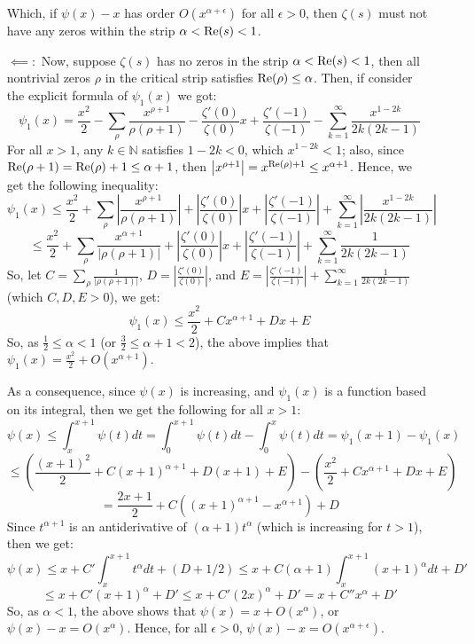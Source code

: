 \documentclass{article}
\begin{document}
\begin{itemize}
    Which, if $\psi(x)-x$ has order $O(x^{\alpha+\epsilon})$ for all $\epsilon>0$, then $\zeta(s)$ must not have any zeros within the strip $\alpha<\textmd{Re}(s)<1$.
    
    \hfil

    \item[$\impliedby:$] Now, suppose $\zeta(s)$ has no zeros in the strip $\alpha<\textmd{Re}(s)<1$, then all nontrivial zeros $\rho$ in the critical strip satisfies $\textmd{Re}(\rho)\leq \alpha$. Then, if consider the explicit formula of $\psi_1(x)$ we got:
    $$\psi_1(x)=\frac{x^2}{2}-\sum_{\rho}\frac{x^{\rho+1}}{\rho(\rho+1)}-\frac{\zeta'(0)}{\zeta(0)}x+\frac{\zeta'(-1)}{\zeta(-1)}-\sum_{k=1}^{\infty}\frac{x^{1-2k}}{2k(2k-1)}$$
    For all $x>1$, any $k\in\mathbb{N}$ satisfies $1-2k<0$, which $x^{1-2k}<1$; also, since $\textmd{Re}(\rho+1)=\textmd{Re}(\rho)+1 \leq \alpha+1$, then $\left|x^{\rho+1}\right| = x^{\textmd{Re}(\rho)+1} \leq x^{\alpha+1}$. Hence, we get the following inequality:
    $$\psi_1(x) \leq \frac{x^2}{2}+\sum_{\rho}\left|\frac{x^{\rho+1}}{\rho(\rho+1)}\right| + \left|\frac{\zeta'(0)}{\zeta(0)}\right|x + \left|\frac{\zeta'(-1)}{\zeta(-1)}\right| + \sum_{k=1}^{\infty}\left|\frac{x^{1-2k}}{2k(2k-1)}\right|$$
    $$ \leq \frac{x^2}{2}+\sum_{\rho}\frac{x^{\alpha+1}}{|\rho(\rho+1)|}+\left|\frac{\zeta'(0)}{\zeta(0)}\right|x + \left|\frac{\zeta'(-1)}{\zeta(-1)}\right| + \sum_{k=1}^{\infty}\frac{1}{2k(2k-1)}$$
    So, let $C = \sum_{\rho}\frac{1}{|\rho(\rho+1)|}$, $D=\left|\frac{\zeta'(0)}{\zeta(0)}\right|$, and $E = \left|\frac{\zeta'(-1)}{\zeta(-1)}\right| + \sum_{k=1}^{\infty}\frac{1}{2k(2k-1)}$ (which $C,D,E> 0$), we get:
    $$\psi_1(x) \leq \frac{x^2}{2}+Cx^{\alpha+1}+Dx + E$$
    So, as $\frac{1}{2}\leq \alpha <1$ (or $\frac{3}{2}\leq \alpha+1<2$), the above implies that $\psi_1(x)=\frac{x^2}{2} +O(x^{\alpha+1})$.

    As a consequence, since $\psi(x)$ is increasing, and $\psi_1(x)$ is a function based on its integral, then we get the following for all $x>1$:
    $$\psi(x)\leq \int_{x}^{x+1}\psi(t)dt = \int_{0}^{x+1}\psi(t)dt - \int_{0}^{x}\psi(t)dt = \psi_1(x+1)-\psi_1(x)$$
    $$\leq \left(\frac{(x+1)^2}{2}+C(x+1)^{\alpha+1}+D(x+1)+E\right)-\left(\frac{x^2}{2}+Cx^{\alpha+1}+Dx+E\right)$$
    $$ = \frac{2x+1}{2} + C\left((x+1)^{\alpha+1}-x^{\alpha+1}\right) + D$$
    Since $t^{\alpha+1}$ is an antiderivative of $(\alpha+1)t^{\alpha}$ (which is increasing for $t>1$), then we get:
    $$\psi(x)\leq x + C'\int_{x}^{x+1}t^{\alpha}dt + (D+1/2) \leq x+C(\alpha+1)\int_{x}^{x+1}(x+1)^{\alpha}dt + D'$$
    $$\leq x + C'(x+1)^\alpha + D' \leq x+C'(2x)^\alpha + D' = x+C''x^\alpha + D'$$
    So, as $\alpha<1$, the above shows that $\psi(x) = x+O(x^{\alpha})$, or $\psi(x)-x=O(x^{\alpha})$. Hence, for all $\epsilon>0$, $\psi(x)-x = O(x^{\alpha+\epsilon})$.
\end{itemize}
\end{document}
